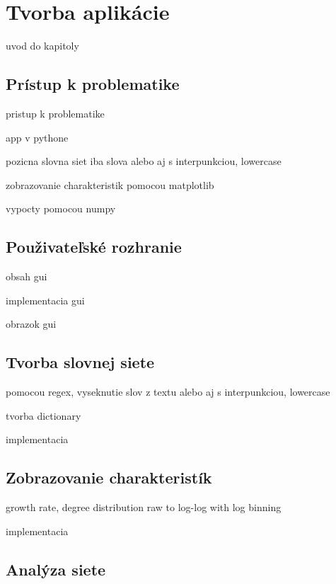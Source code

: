\chapter{Tvorba aplikácie}\label{ch:appCreation}

uvod do kapitoly

\section{Prístup k problematike}\label{sec:pristupProblematika}

pristup k problematike 

app v pythone

pozicna slovna siet iba slova alebo aj s interpunkciou, lowercase

zobrazovanie charakteristik pomocou matplotlib

vypocty pomocou numpy

\section{Použivateľské rozhranie}\label{sec:pouzivatelskeRozhranie}

obsah gui

implementacia gui

obrazok gui



\section{Tvorba slovnej siete}\label{sec:tvorbaSlovnaSiet}

pomocou regex, vyseknutie slov z textu alebo aj s interpunkciou, lowercase

tvorba dictionary

implementacia

\section{Zobrazovanie charakteristík}\label{sec:zobrazovanieCharakteristik}

growth rate, degree distribution raw to log-log with log binning

implementacia

\section{Analýza siete}\label{sec:analyzaSiete}

